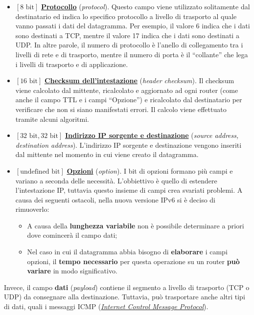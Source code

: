 \documentclass[a4paper]{article}
\newcommand{\dquotes}[1]{``#1''}
\begin{document}
\begin{itemize}
		\item $\left[8\text{ bit}\right]$ \underline{\textbf{Protocollo}} (\emph{protocol}). Questo campo viene utilizzato solitamente dal destinatario ed indica lo specifico protocollo a livello di trasporto al quale vanno passati i dati del datagramma. Per esempio, il valore 6 indica che i dati sono destinati a TCP, mentre il valore 17 indica che i dati sono destinati a UDP. In altre parole, il numero di protocollo è l’anello di collegamento tra i livelli di rete e di trasporto, mentre il numero di porta è il \dquotes{collante} che lega i livelli di trasporto e di applicazione.
		
		\item $\left[16\text{ bit}\right]$ \underline{\textbf{Checksum dell'intestazione}} (\emph{header checksum}). Il checksum viene calcolato dal mittente, ricalcolato e aggiornato ad ogni router (come anche il campo TTL e i campi \dquotes{Opzione}) e ricalcolato dal destinatario per verificare che non si siano manifestati errori. Il calcolo viene effettuato tramite alcuni algoritmi.
		
		\item $\left[32\text{ bit}, 32\text{ bit}\right]$ \underline{\textbf{Indirizzo IP sorgente e destinazione}} (\emph{source address, destination address}). L'indirizzo IP sorgente e destinazione vengono inseriti dal mittente nel momento in cui viene creato il datagramma.
		
		\item $\left[\text{undefined bit}\right]$ \underline{\textbf{Opzioni}} (\emph{option}). I bit di opzioni formano più campi e variano a seconda delle necessità. L’obbiettivo è quello di estendere l’intestazione IP, tuttavia questo insieme di campi crea svariati problemi. A causa dei seguenti ostacoli, nella nuova versione IPv6 si è deciso di rimuoverlo:
		\begin{itemize}
			\item A causa della \textbf{lunghezza variabile} non è possibile determinare a priori dove comincerà il campo dati;
			
			\item Nel caso in cui il datagramma abbia bisogno di \textbf{elaborare} i campi opzioni, il \textbf{tempo necessario} per questa operazione su un router \textbf{può variare} in modo significativo.
		\end{itemize}
	\end{itemize}
	Invece, il campo \textbf{dati} (\emph{payload}) contiene il segmento a livello di trasporto (TCP o UDP) da consegnare alla destinazione. Tuttavia, può trasportare anche altri tipi di dati, quali i messaggi ICMP (\href{https://en.wikipedia.org/wiki/Internet_Control_Message_Protocol}{\emph{Internet Control Message Protocol}}).\newpage
	
\end{document}
